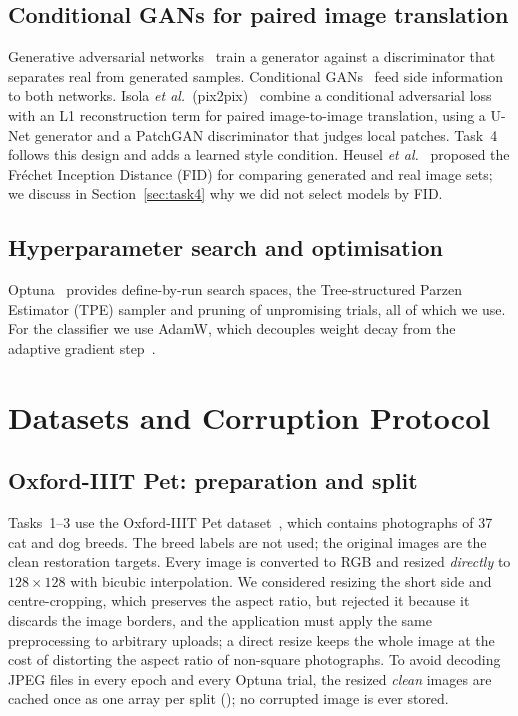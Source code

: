 \documentclass[conference]{IEEEtran}
\DeclareRobustCommand{\file}[1]{\expandafter\filepath\expandafter{\detokenize{#1}}}
\begin{document}
\subsection{Conditional GANs for paired image translation}
Generative adversarial networks~\cite{goodfellow2014generative} train a
generator against a discriminator that separates real from generated
samples. Conditional GANs~\cite{mirza2014conditional} feed side information
to both networks. Isola \emph{et al.}~(pix2pix)~\cite{isola2017image}
combine a conditional adversarial loss with an L1 reconstruction term for
paired image-to-image translation, using a U-Net generator and a PatchGAN
discriminator that judges local patches. Task~4 follows this design and
adds a learned style condition. Heusel \emph{et
al.}~\cite{heusel2017gans} proposed the Fr\'echet Inception Distance (FID)
for comparing generated and real image sets; we discuss in
Section~\ref{sec:task4} why we did not select models by FID.

\subsection{Hyperparameter search and optimisation}
Optuna~\cite{akiba2019optuna} provides define-by-run search spaces, the
Tree-structured Parzen Estimator (TPE) sampler and pruning of unpromising
trials, all of which we use. For the classifier we use AdamW, which
decouples weight decay from the adaptive gradient
step~\cite{loshchilov2019decoupled}.

\section{Datasets and Corruption Protocol}
\label{sec:data}

\subsection{Oxford-IIIT Pet: preparation and split}
Tasks~1--3 use the Oxford-IIIT Pet dataset~\cite{parkhi2012cats}, which
contains photographs of 37 cat and dog breeds. The breed labels are not
used; the original images are the clean restoration targets. Every image
is converted to RGB and resized \emph{directly} to $128\times128$ with
bicubic interpolation. We considered resizing the short side and
centre-cropping, which preserves the aspect ratio, but rejected it because
it discards the image borders, and the application must apply the same
preprocessing to arbitrary uploads; a direct resize keeps the whole image at
the cost of distorting the aspect ratio of non-square photographs. To
avoid decoding JPEG files in every epoch and every Optuna trial, the
resized \emph{clean} images are cached once as one array per split
(\file{data/pet_128/}); no corrupted image is ever stored.
\end{document}
